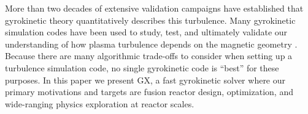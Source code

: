 \documentclass{jpp}
\newcommand{\GX}{{GX}\xspace}
\begin{document}
More than two decades of extensive validation campaigns have established that gyrokinetic theory quantitatively describes this turbulence. Many gyrokinetic simulation codes {\color{black} \citep{parker1993a, kotschenreuther1995, dorland2000, lin2000, jenko2000, jost2001,Candy2003,idomura2003,watanabe2005,wang2006,jolliet2007, lanti2019,idomura2008,peeters2009,Candy2016,Barnes2019}} have been used to study, test, and ultimately validate our understanding of how plasma turbulence depends on the magnetic geometry \citep[see \emph{e.g.}][]{Belli2008,Marinoni2009,Mynick2009,White2019}. Because there are many algorithmic trade-offs to consider when setting up a turbulence simulation code, 
no single gyrokinetic code is ``best'' for these purposes. In this paper we present \GX, {\color{black} a fast gyrokinetic solver where our primary motivations and targets are fusion reactor design, optimization, and wide-ranging physics exploration at reactor scales.
}
\end{document}
